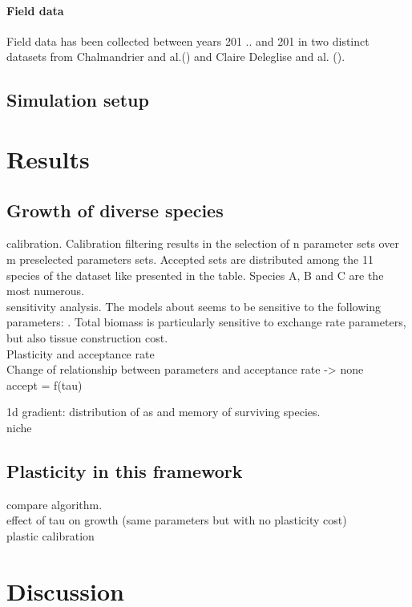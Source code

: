 \documentclass[review]{elsarticle}
\begin{document}
\paragraph{Field data}
Field data has been collected between years 201 .. and 201 in two distinct datasets from Chalmandrier and al.() and Claire Deleglise and al. (). 
\subsection{Simulation setup}

\section{Results}
\subsection{Growth of diverse species}
calibration. Calibration filtering results in the selection of n parameter sets over m preselected parameters sets. Accepted sets are distributed among the 11 species of the dataset like presented in the table. Species A, B and C are the most numerous.\\
sensitivity analysis. The models about seems to be sensitive to the following parameters: . Total biomass is particularly sensitive to exchange rate parameters, but also tissue construction cost.\\

Plasticity and acceptance rate\\
Change of relationship between parameters and acceptance rate -> none\\
accept = f(tau)

1d gradient: distribution of as and memory of surviving species.\\
niche\\

\subsection{Plasticity in this framework}
compare algorithm.\\
effect of tau on growth (same parameters but with no plasticity cost)\\
plastic calibration\\


\section{Discussion}
\end{document}
